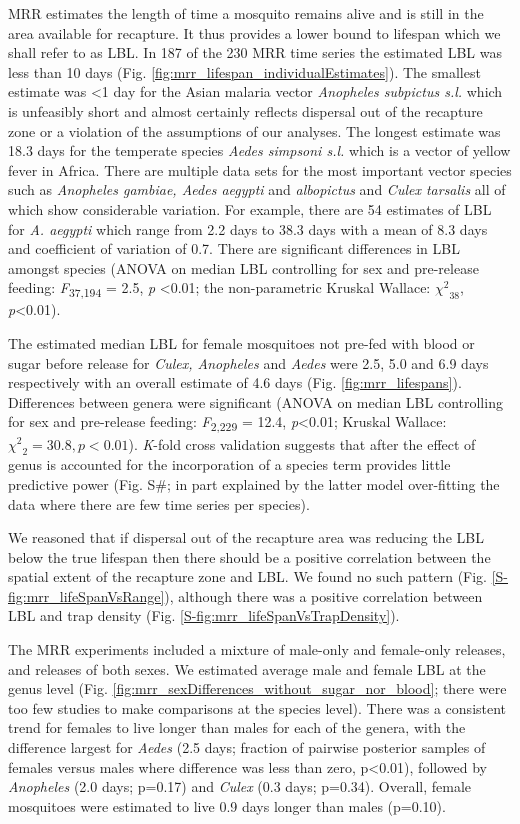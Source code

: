 \documentclass[]{article}
\begin{document}
MRR estimates the length of time a mosquito remains alive and is still
in the area available for recapture. It thus provides a lower bound to
lifespan which we shall refer to as LBL. In 187 of the 230 MRR time
series the estimated LBL was less than 10 days (Fig. \ref{fig:mrr_lifespan_individualEstimates}). The smallest
estimate was \textless{}1 day for the Asian malaria vector
\emph{Anopheles subpictus s.l.} which is unfeasibly short and almost
certainly reflects dispersal out of the recapture zone or a violation of
the assumptions of our analyses. The longest estimate was 18.3 days for
the temperate species \emph{Aedes simpsoni s.l.} which is a vector of
yellow fever in Africa. There are multiple data sets for the most
important vector species such as \emph{Anopheles gambiae, Aedes aegypti}
and \emph{albopictus} and \emph{Culex tarsalis} all of which show
considerable variation. For example, there are 54 estimates of LBL for
\emph{A. aegypti} which range from 2.2 days to 38.3 days with a mean of
8.3 days and coefficient of variation of 0.7. There are significant
differences in LBL amongst species (ANOVA on median LBL controlling for
sex and pre-release feeding: \emph{F}\textsubscript{37,194} = 2.5,
\emph{p} \textless{}0.01; the non-parametric Kruskal Wallace:
\({\chi^{2}}_{38}\), \emph{p}\textless{}0.01).

The estimated median LBL for female mosquitoes not pre-fed with blood or
sugar before release for \emph{Culex, Anopheles} and \emph{Aedes} were
2.5, 5.0 and 6.9 days respectively with an overall estimate of 4.6 days
(Fig. \ref{fig:mrr_lifespans}). Differences between genera were significant (ANOVA on median
LBL controlling for sex and pre-release feeding:
\emph{F}\textsubscript{2,229} = 12.4, \emph{p}\textless{}0.01; Kruskal
Wallace: \({\chi^{2}}_{2} = 30.8,p < 0.01\)). \emph{K}-fold cross
validation suggests that after the effect of genus is accounted for the
incorporation of a species term provides little predictive power (Fig.
S\#; in part explained by the latter model over-fitting the data where
there are few time series per species).

We reasoned that if dispersal out of the recapture area was reducing the
LBL below the true lifespan then there should be a positive correlation
between the spatial extent of the recapture zone and LBL. We found no
such pattern (Fig. \ref{S-fig:mrr_lifeSpanVsRange}), although there was a positive correlation
between LBL and trap density (Fig. \ref{S-fig:mrr_lifeSpanVsTrapDensity}).

The MRR experiments included a mixture of male-only and female-only
releases, and releases of both sexes. We estimated average male and
female LBL at the genus level (Fig. \ref{fig:mrr_sexDifferences_without_sugar_nor_blood}; there were too few studies to
make comparisons at the species level). There was a consistent trend for
females to live longer than males for each of the genera, with the
difference largest for \emph{Aedes} (2.5 days; fraction of pairwise
posterior samples of females versus males where difference was less than
zero, p\textless{}0.01), followed by \emph{Anopheles} (2.0 days; p=0.17)
and \emph{Culex} (0.3 days; p=0.34). Overall, female mosquitoes were
estimated to live 0.9 days longer than males (p=0.10).
\end{document}
